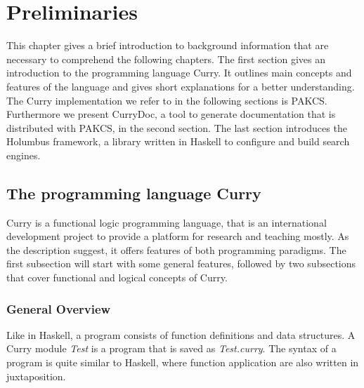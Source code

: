 \documentclass[%
	pdftex,%
	a4paper,%
	oneside,%
	chapterprefix,%
	headsepline,%
	12pt%
]{scrbook}
\begin{document}
\chapter{Preliminaries}\label{preliminaries}
This chapter gives a brief introduction to background information that
are necessary to comprehend the following chapters. %
The first section gives an introduction to the programming language
Curry. %
It outlines main concepts and features of the language and gives short
explanations for a better understanding. %
The Curry implementation we refer to in the following sections is
PAKCS\cite{pakcs}. Furthermore we present CurryDoc\cite{currydoc}, a
tool to generate documentation that is distributed with PAKCS, in the
second section. %
The last section introduces the Holumbus\cite{holumbus} framework, a
library written in Haskell to configure and build search engines. %

\section{The programming language Curry}\label{preliminaries:curry}


Curry is a functional logic programming language, that is an
international development project to provide a platform for research
and teaching mostly. %
As the description suggest, it offers features of both programming
paradigms. %
The first subsection will start with some general features, followed
by two subsections that cover functional and logical concepts of
Curry. %

\subsection{General Overview}
Like in Haskell, a program consists of function definitions and data
structures. %
A Curry module \emph{Test} is a program that is saved as
\emph{Test.curry}. %
The syntax of a program is quite similar to Haskell, where function
application are also written in juxtaposition. %
\end{document}
